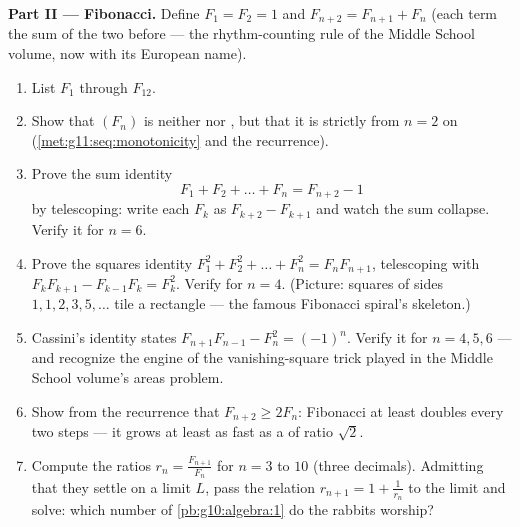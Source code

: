 \begin{problem}
\medskip
\noindent\textbf{Part II --- Fibonacci.}
Define $F_1 = F_2 = 1$ and $F_{n+2} = F_{n+1} + F_n$ (each term
the sum of the two before --- the rhythm-counting rule of the
Middle School volume, now with its European name).
\begin{enumerate}[resume]
  \item List $F_1$ through $F_{12}$.
  \item Show that $(F_n)$ is neither  nor ,
        but that it is strictly  from $n = 2$ on
        (\cref{met:g11:seq:monotonicity} and the recurrence).
  \item Prove the sum identity
        \[
        F_1 + F_2 + \dots + F_n = F_{n+2} - 1
        \]
        by telescoping: write each $F_k$ as
        $F_{k+2} - F_{k+1}$ and watch the sum collapse. Verify
        it for $n = 6$.
  \item Prove the squares identity
        $F_1^2 + F_2^2 + \dots + F_n^2 = F_n F_{n+1}$,
        telescoping with
        $F_k F_{k+1} - F_{k-1} F_k = F_k^2$. Verify for
        $n = 4$. (Picture: squares of sides
        $1, 1, 2, 3, 5, \dots$ tile a rectangle --- the famous
        Fibonacci spiral's skeleton.)
  \item Cassini's identity states
        $F_{n+1} F_{n-1} - F_n^2 = (-1)^n$. Verify it for
        $n = 4, 5, 6$ --- and recognize the engine of the
        vanishing-square trick played in the Middle School
        volume's areas problem.
  \item Show from the recurrence that
        $F_{n+2} \geq 2 F_n$: Fibonacci at least doubles every
        two steps --- it grows at least as fast as a  of ratio $\sqrt2$.
  \item Compute the ratios $r_n = \frac{F_{n+1}}{F_n}$ for
        $n = 3$ to $10$ (three decimals). Admitting that they
        settle on a limit $L$, pass the relation
        $r_{n+1} = 1 + \frac{1}{r_n}$ to the limit and solve:
        which number of \cref{pb:g10:algebra:1} do the rabbits
        worship?
\end{enumerate}


\end{problem}
